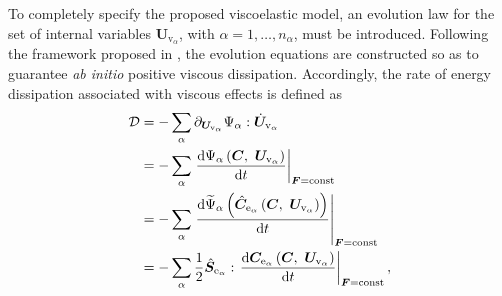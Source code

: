 To completely specify the proposed viscoelastic model, an evolution law for the set of internal variables $\boldsymbol{U}_{\mathrm{v}_\alpha}$, with $\alpha = 1,\ldots,n_{\alpha}$, must be introduced. Following the framework proposed in \cite{Liu2025}, the evolution equations are constructed so as to guarantee \textit{ab initio} positive viscous dissipation. Accordingly, the rate of energy dissipation associated with viscous effects is defined as
%
\begin{equation}
	\label{eqn:dvis_inequality}
	\begin{aligned}
		\mathcal{D} &= - \sum_{\alpha} {{\partial_{ \boldsymbol{U}_{\mathrm{v}_\alpha}}} \Psi_\alpha}{} : \dot{\boldsymbol{U}}_{\mathrm{v}_\alpha} \\
		&=-\sum_{\alpha} \left.\frac{\mathrm{d}\Psi_\alpha \left(\boldsymbol{C},~\boldsymbol{U}_{\mathrm{v}_\alpha} \right)}{\mathrm{d}t} \right|_{\boldsymbol{F}=\text{const}} \\
		&= -\sum_{\alpha} \left.\frac{\mathrm{d}\widetilde{\Psi}_\alpha \left(\hat{\boldsymbol{C}}_{\mathrm{e}_{\alpha}}\left(\boldsymbol{C},~\boldsymbol{U}_{\mathrm{v}_\alpha} \right)\right)}{\mathrm{d}t} \right|_{\boldsymbol{F}=\text{const}} \\
		&=-\sum_{\alpha} \frac{1}{2}\hat{\boldsymbol{S}}_{\mathrm{e}_{\alpha}} : \left.\frac{\mathrm{d}{\boldsymbol{C}}_{\mathrm{e}_{\alpha}} \left(\boldsymbol{C},~\boldsymbol{U}_{\mathrm{v}_\alpha} \right)}{\mathrm{d}t} \right|_{\boldsymbol{F}=\text{const}},
	\end{aligned}
\end{equation}
%

